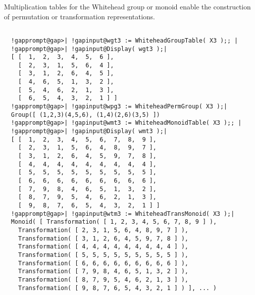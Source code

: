 \documentclass[a4paper,11pt]{report}
\begin{document}
{{{ Multiplication tables for the Whitehead group or monoid enable the
construction of permutation or transformation representations. }

 
\begin{Verbatim}[commandchars=!@|,fontsize=\small,frame=single,label=Example]
  
  !gapprompt@gap>| !gapinput@wgt3 := WhiteheadGroupTable( X3 );; |
  !gapprompt@gap>| !gapinput@Display( wgt3 );|
  [ [  1,  2,  3,  4,  5,  6 ],
    [  2,  3,  1,  5,  6,  4 ],
    [  3,  1,  2,  6,  4,  5 ],
    [  4,  6,  5,  1,  3,  2 ],
    [  5,  4,  6,  2,  1,  3 ],
    [  6,  5,  4,  3,  2,  1 ] ]
  !gapprompt@gap>| !gapinput@wpg3 := WhiteheadPermGroup( X3 );|
  Group([ (1,2,3)(4,5,6), (1,4)(2,6)(3,5) ])
  !gapprompt@gap>| !gapinput@wmt3 := WhiteheadMonoidTable( X3 );; |
  !gapprompt@gap>| !gapinput@Display( wmt3 );|
  [ [  1,  2,  3,  4,  5,  6,  7,  8,  9 ],
    [  2,  3,  1,  5,  6,  4,  8,  9,  7 ],
    [  3,  1,  2,  6,  4,  5,  9,  7,  8 ],
    [  4,  4,  4,  4,  4,  4,  4,  4,  4 ],
    [  5,  5,  5,  5,  5,  5,  5,  5,  5 ],
    [  6,  6,  6,  6,  6,  6,  6,  6,  6 ],
    [  7,  9,  8,  4,  6,  5,  1,  3,  2 ],
    [  8,  7,  9,  5,  4,  6,  2,  1,  3 ],
    [  9,  8,  7,  6,  5,  4,  3,  2,  1 ] ]
  !gapprompt@gap>| !gapinput@wtm3 := WhiteheadTransMonoid( X3 );|
  Monoid( [ Transformation( [ 1, 2, 3, 4, 5, 6, 7, 8, 9 ] ),
    Transformation( [ 2, 3, 1, 5, 6, 4, 8, 9, 7 ] ),
    Transformation( [ 3, 1, 2, 6, 4, 5, 9, 7, 8 ] ),
    Transformation( [ 4, 4, 4, 4, 4, 4, 4, 4, 4 ] ),
    Transformation( [ 5, 5, 5, 5, 5, 5, 5, 5, 5 ] ),
    Transformation( [ 6, 6, 6, 6, 6, 6, 6, 6, 6 ] ),
    Transformation( [ 7, 9, 8, 4, 6, 5, 1, 3, 2 ] ),
    Transformation( [ 8, 7, 9, 5, 4, 6, 2, 1, 3 ] ),
    Transformation( [ 9, 8, 7, 6, 5, 4, 3, 2, 1 ] ) ], ... )
  
\end{Verbatim}
 }

 }

            
\end{document}
